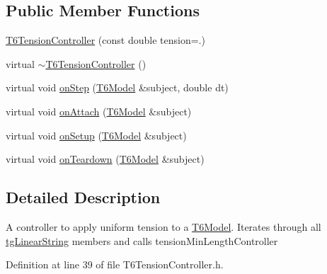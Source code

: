\subsection*{Public Member Functions}
\begin{DoxyCompactItemize}
\item 
\hyperlink{class_t6_tension_controller_ad389b5f78726db80e793cc16c76357d1}{T6\-Tension\-Controller} (const double tension=.)
\item 
virtual \hyperlink{class_t6_tension_controller_afa5ca68d156bf3a360432438a6035f50}{$\sim$\-T6\-Tension\-Controller} ()
\item 
virtual void \hyperlink{class_t6_tension_controller_a63fdbb09fd74b79c16f5cf441041c1e3}{on\-Step} (\hyperlink{class_t6_model}{T6\-Model} \&subject, double dt)
\item 
virtual void \hyperlink{classtg_observer_a0ecd07483eb41f9a0ab19b8ed24052f1}{on\-Attach} (\hyperlink{class_t6_model}{T6\-Model} \&subject)
\item 
virtual void \hyperlink{classtg_observer_ae7b2de87bd4a6e786bc16f1b801c36a6}{on\-Setup} (\hyperlink{class_t6_model}{T6\-Model} \&subject)
\item 
virtual void \hyperlink{classtg_observer_a1663edb3732e5ffb7bbe6bfb4ade88b8}{on\-Teardown} (\hyperlink{class_t6_model}{T6\-Model} \&subject)
\end{DoxyCompactItemize}


\subsection{Detailed Description}
A controller to apply uniform tension to a \hyperlink{class_t6_model}{T6\-Model}. Iterates through all \hyperlink{classtg_linear_string}{tg\-Linear\-String} members and calls tension\-Min\-Length\-Controller 

Definition at line 39 of file T6\-Tension\-Controller.\-h.



